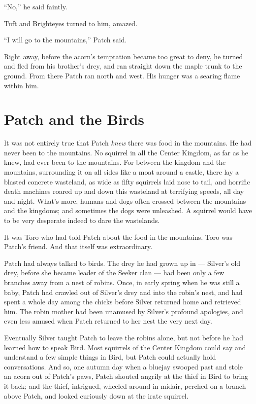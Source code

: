\documentclass[ebook,oneside,openany,17pt]{memoir}
\renewcommand{\thechapter}{\Roman{chapter}}
\newcounter{sections}
\newcommand{\sections}[1]{%
  \section*{#1}
  \addtocounter{sections}{1}%
  \pdfbookmark[1]{#1}{section.\thechapter.\thesections}}
\begin{document}
“No,” he said faintly.

Tuft and Brighteyes turned to him, amazed.

“I will go to the mountains,” Patch said.

Right away, before the acorn’s temptation became too great to deny, he
turned and fled from his brother’s drey, and ran straight down the
maple trunk to the ground. From there Patch ran north and west. His
hunger was a searing flame within him.


\sections{Patch and the Birds}

It was not entirely true that Patch \emph{knew} there was food in
the mountains. He had never been to the mountains. No squirrel in all
the Center Kingdom, as far as he knew, had ever been to the
mountains. For between the kingdom and the mountains, surrounding it
on all sides like a moat around a castle, there lay a blasted concrete
wasteland, as wide as fifty squirrels laid nose to tail, and horrific
death machines roared up and down this wasteland at terrifying speeds,
all day and night. What’s more, humans and dogs often crossed between
the mountains and the kingdoms; and sometimes the dogs were
unleashed. A squirrel would have to be very desperate indeed to dare
the wastelands.

It was Toro who had told Patch about the food in the mountains. Toro
was Patch’s friend. And that itself was extraordinary.

Patch had always talked to birds. The drey he had grown up in —
Silver’s old drey, before she became leader of the Seeker clan — had
been only a few branches away from a nest of robins. Once, in early
spring when he was still a baby, Patch had crawled out of Silver’s
drey and into the robin’s nest, and had spent a whole day among the
chicks before Silver returned home and retrieved him. The robin mother
had been unamused by Silver’s profound apologies, and even less amused
when Patch returned to her nest the very next day.

Eventually Silver taught Patch to leave the robins alone, but not
before he had learned how to speak Bird. Most squirrels of the Center
Kingdom could say and understand a few simple things in Bird, but
Patch could actually hold conversations. And so, one autumn day when a
bluejay swooped past and stole an acorn out of Patch’s paws, Patch
shouted angrily at the thief in Bird to bring it back; and the thief,
intrigued, wheeled around in midair, perched on a branch above Patch,
and looked curiously down at the irate squirrel.
\end{document}
